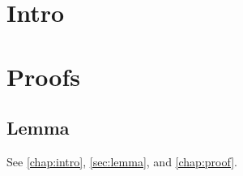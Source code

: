 \documentclass[twocolumn,unicode]{wrapper}
\begin{document}
\wrapperclass\bookclass\layoutmode\hypermode
\tableofcontents
\chapter{Intro}\label{chap:intro}
\appendix
\chapter{Proofs}\label{chap:proof}
\section{Lemma}\label{sec:lemma}
See \autoref{chap:intro}, \autoref{sec:lemma}, and \autoref{chap:proof}.
\end{document}
